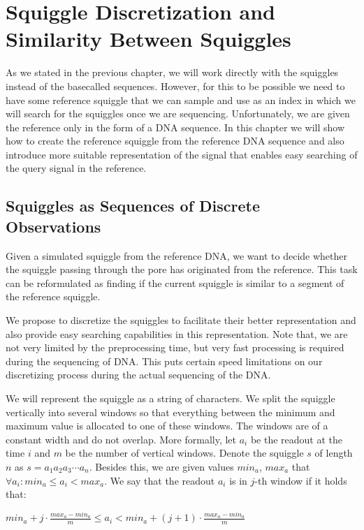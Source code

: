 \chapter{Squiggle Discretization and Similarity Between Squiggles}

\label{kap:proposedMethod}

As we stated in the previous chapter, we will work directly with the squiggles instead
of the basecalled sequences. However, for this to be possible we need to have 
some reference squiggle that we can sample and use as an index in which
we will search for the squiggles once we are sequencing.
Unfortunately, we are given the reference only in the form of a DNA sequence.
In this chapter we will show how to create the reference squiggle from the reference DNA sequence and also
introduce more suitable representation of the signal that enables easy searching of the
query signal in the reference.

\section{Squiggles as Sequences of Discrete Observations}

Given a simulated squiggle from the reference DNA, we want to decide whether the
squiggle passing through the pore has originated from the reference. This task
can be reformulated as finding if the current squiggle is similar to a segment of the reference squiggle.

We propose to discretize the squiggles to facilitate their better representation
and also provide easy searching capabilities in this representation. Note that, we are
not very limited by the preprocessing time, but very fast processing is required during
the sequencing of DNA. This puts certain speed limitations on our discretizing
process during the actual sequencing of the DNA.

We will represent the squiggle as a string of characters. We split the squiggle
vertically into several windows so that everything between the minimum and maximum
value is allocated to one of these windows. The windows are of a constant width and do not
overlap. More formally, let $a_i$ be the readout at the time $i$ and $m$ be the number of
vertical windows. Denote the squiggle $s$ of length $n$ as $s=a_1a_2a_3\cdots a_n$.
Besides this, we are given values $min_a$, $max_a$ that $\forall a_i: min_a \leq a_i < max_a$.
We say that the readout $a_i$ is in $j$-th window if it holds that:

\begin{center}
$min_a + j\cdot \frac{max_a-min_a}{m} \leq a_i < min_a + (j+1)\cdot \frac{max_a-min_a}{m}$
\end{center}

